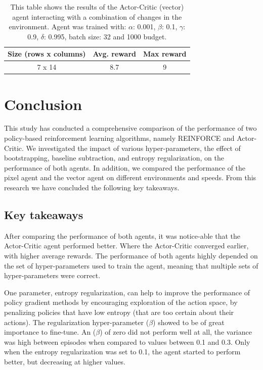 \documentclass{article}
\begin{document}
\begin{table}[]
    \centering
    \begin{tabular}{|c|c|c|}
        \hline
        \textbf{Size (rows x columns)} & \textbf{Avg. reward} & \textbf{Max reward} \\
        \hline
        7 x 14                & 8.7         & 9    \\ 
        \hline              
    \end{tabular}
    \caption{This table shows the results of the Actor-Critic (vector) agent interacting with a combination of changes in the environment. 
    Agent was trained with: $\alpha$: 0.001, $\beta$: 0.1, $\gamma$: 0.9, $\delta$: 0.995, batch size: 32 and 1000 budget. }
    \label{tab:Vector-comb}
\end{table}


\section{Conclusion}
\label{Conclusion}

This study has conducted a comprehensive comparison of the performance of two policy-based reinforcement learning algorithms, namely REINFORCE and Actor-Critic.
We investigated the impact of various hyper-parameters, the effect of bootstrapping, baseline subtraction, and entropy regularization, on the performance of both agents. 
In addition, we compared the performance of the pixel agent and the vector agent on different environments and speeds. 
From this research we have concluded the following key takeaways.

\subsection{Key takeaways} %
\label{C-Takeaways}
After comparing the performance of both agents, it was notice-able that the Actor-Critic agent performed better. 
Where the Actor-Critic converged earlier, with higher average rewards.
The performance of both agents highly depended on the set of hyper-parameters used to train the agent, meaning that multiple sets of hyper-parameters were correct. 

One parameter, entropy regularization, can help to improve the performance of policy gradient methods by encouraging exploration of the action space, by penalizing policies that have low entropy (that are too certain about their actions).
The regularization hyper-parameter ($\beta$) showed to be of great importance to fine-tune. 
An ($\beta$) of zero did not perform well at all, the variance was high between episodes when compared to values between 0.1 and 0.3. 
Only when the entropy regularization was set to 0.1, the agent started to perform better, but decreasing at higher values.
\end{document}
